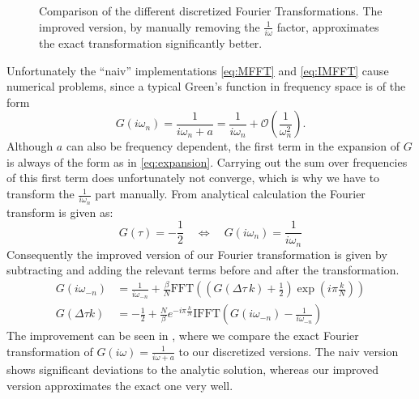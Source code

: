 \begin{appendix}
\begin{figure}[h]
	\caption{Comparison of the different discretized Fourier Transformations. The improved version, by manually removing the $\frac{1}{i \omega}$ factor, approximates the exact transformation significantly better. }
	\label{fig:fourier_traf}
\end{figure}
Unfortunately the ``naiv'' implementations \eqref{eq:MFFT} and \eqref{eq:IMFFT} cause numerical problems, since a typical Green's function in frequency space is of the form
\begin{equation}
	G(iω_n) = \frac{1}{iω_n +a} = \frac{1}{i ω_n} + \mathcal{O}\left(\frac{1}{ω_n^2}\right).
	\label{eq:expansion}
\end{equation}
Although $a$ can also be frequency dependent, the first term in the expansion of $G$ is always of the form as in \eqref{eq:expansion}. Carrying out the sum over frequencies of this first term does unfortunately not converge, which is why we have to transform the $\frac{1}{i ω_n}$ part manually. %
From analytical calculation the Fourier transform is given as:
\begin{equation}
	G(τ)=-\frac{1}{2} \quad ⇔ \quad G(i ω_n) =\frac{1}{i ω_n}
	\label{eq:ff_pair}
\end{equation}
Consequently the improved version of our Fourier transformation is given by subtracting and adding the relevant terms before and after the transformation.
\begin{align}
	G(i ω_{-n})&= \frac{1}{i ω_{-n}}+\frac{\beta}{N} \mathrm{FFT}\left( \left(G(\Delta τ \, k)+\frac{1}{2}\right)\exp{\left(i π \frac{k}{N}\right)}\right)\\
	G(\Delta τ k)&= -\frac{1}{2}+\frac{N}{β} e^{-i π \frac{k}{N}}\mathrm{IFFT}\left(G(iω_{-n})-\frac{1}{i ω_{-n}}\right)
	\label{eq:improved_fft}
\end{align}
The improvement can be seen in , where we compare the exact Fourier transformation of $G(i ω)=\frac{1}{iω+a}$ to our discretized versions. The naiv version shows significant deviations to the analytic solution, whereas our improved version approximates the exact one very well.  



\end{appendix}

